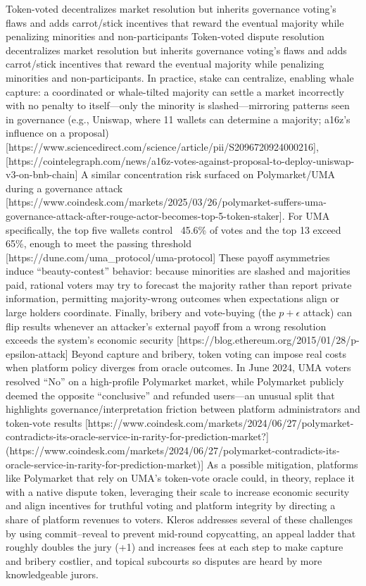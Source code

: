 Token-voted decentralizes market resolution but inherits governance voting’s flaws and adds carrot/stick incentives that reward the eventual majority while penalizing minorities and non-participants Token-voted dispute resolution decentralizes market resolution but inherits governance voting’s flaws and adds carrot/stick incentives that reward the eventual majority while penalizing minorities and non-participants. In practice, stake can centralize, enabling whale capture: a coordinated or whale-tilted majority can settle a market incorrectly with no penalty to itself—only the minority is slashed—mirroring patterns seen in governance (e.g., Uniswap, where 11 wallets can determine a majority; a16z’s influence on a proposal) [https://www.sciencedirect.com/science/article/pii/S2096720924000216], [https://cointelegraph.com/news/a16z-votes-against-proposal-to-deploy-uniswap-v3-on-bnb-chain] A similar concentration risk surfaced on Polymarket/UMA during a governance attack [https://www.coindesk.com/markets/2025/03/26/polymarket-suffers-uma-governance-attack-after-rouge-actor-becomes-top-5-token-staker]. For UMA specifically, the top five wallets control ~45.6\% of votes and the top 13 exceed 65\%, enough to meet the passing threshold
[https://dune.com/uma\_protocol/uma-protocol]
These payoff asymmetries induce “beauty-contest” behavior: because minorities are slashed and majorities paid, rational voters may try to forecast the majority rather than report private information, permitting majority-wrong outcomes when expectations align or large holders coordinate. Finally, bribery and vote-buying (the $p+\epsilon $ attack) can flip results whenever an attacker’s external payoff from a wrong resolution exceeds the system’s economic security [https://blog.ethereum.org/2015/01/28/p-epsilon-attack]
Beyond capture and bribery, token voting can impose real costs when platform policy diverges from oracle outcomes. In June 2024, UMA voters resolved “No” on a high-profile Polymarket market, while Polymarket publicly deemed the opposite “conclusive” and refunded users—an unusual split that highlights governance/interpretation friction between platform administrators and token-vote results
[https://www.coindesk.com/markets/2024/06/27/polymarket-contradicts-its-oracle-service-in-rarity-for-prediction-market?](https://www.coindesk.com/markets/2024/06/27/polymarket-contradicts-its-oracle-service-in-rarity-for-prediction-market)]
As a possible mitigation, platforms like Polymarket that rely on UMA’s token-vote oracle could, in theory, replace it with a native dispute token, leveraging their scale to increase economic security and align incentives for truthful voting and platform integrity by directing a share of platform revenues to voters.
Kleros addresses several of these challenges by using commit–reveal to prevent mid-round copycatting, an appeal ladder that roughly doubles the jury (+1) and increases fees at each step to make capture and bribery costlier, and topical subcourts so disputes are heard by more knowledgeable jurors.

